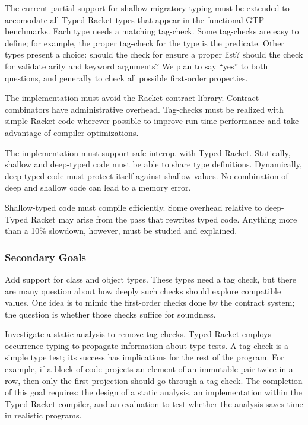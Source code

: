 The current partial support for shallow migratory typing must be extended to accomodate all Typed Racket types
 that appear in the functional GTP benchmarks.
Each type needs a matching tag-check.
Some tag-checks are easy to define; for example, the proper tag-check for the  type is the  predicate.
Other types present a choice:
 should the check for  ensure a proper list?
 should the check for \racketcode{->*} validate arity and keyword arguments?
We plan to say ``yes'' to both questions, and generally to check all possible first-order properties.

The implementation must avoid the Racket contract library.
Contract combinators have administrative overhead.
Tag-checks must be realized with simple Racket code wherever possible to
improve run-time performance and take advantage of compiler optimizations.

The implementation must support safe interop. with Typed Racket.
Statically, shallow and deep-typed code must be able to share type definitions.
Dynamically, deep-typed code must protect itself against shallow values.
No combination of deep and shallow code can lead to a memory error.

Shallow-typed code must compile efficiently.
Some overhead relative to deep-Typed Racket may arise from the pass that
rewrites typed code.
Anything more than a 10\% slowdown, however, must be studied and explained.


\subsubsection{Secondary Goals}

Add support for class and object types.
These types need a tag check, but there are many question about how deeply such
 checks should explore compatible values.
One idea is to mimic the first-order checks done by the contract system;
 the question is whether those checks suffice for soundness.

Investigate a static analysis to remove tag checks.
Typed Racket employs occurrence typing to propagate information about type-tests.
A tag-check is a simple type test; its success has implications for the rest of
the program.
For example, if a block of code projects an element of an immutable pair twice in a row,
 then only the first projection should go through a tag check.
The completion of this goal requires: the design of a static analysis,
 an implementation within the Typed Racket compiler,
 and an evaluation to test whether the analysis saves time in realistic programs.

